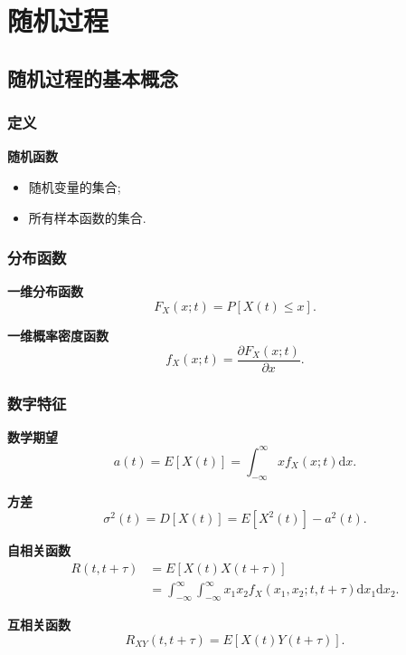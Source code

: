 \section{随机过程}
\subsection{随机过程的基本概念}
\subsubsection{定义}
\textbf{随机函数}
\begin{itemize}
    \item 随机变量的集合;
    \item 所有样本函数的集合.
\end{itemize}

\subsubsection{分布函数}
\textbf{一维分布函数}
\begin{equation}
    F_X(x;t)=P[X(t)\leq x].
\end{equation}

\textbf{一维概率密度函数}
\begin{equation}
    f_X(x;t)=\frac{\partial F_X(x;t)}{\partial x}.
\end{equation}

\subsubsection{数字特征}
\textbf{数学期望}
\begin{equation}
    a(t)=E[X(t)]=\int_{-\infty}^{\infty}xf_X(x;t)\mathrm{d}x.
\end{equation}

\textbf{方差}
\begin{equation}
    \sigma^2(t)=D[X(t)]=E[X^2(t)]-a^2(t).
\end{equation}

\textbf{自相关函数}
\begin{equation}
    \begin{aligned}
        R(t,t+\tau) & =E[X(t)X(t+\tau)]                                                                                     \\
                    & =\int_{-\infty}^{\infty}\int_{-\infty}^{\infty}x_1x_2f_X(x_1,x_2;t,t+\tau)\mathrm{d}x_1\mathrm{d}x_2.
    \end{aligned}
\end{equation}

\textbf{互相关函数}
\begin{equation}
    R_{XY}(t,t+\tau)=E[X(t)Y(t+\tau)].
\end{equation}

